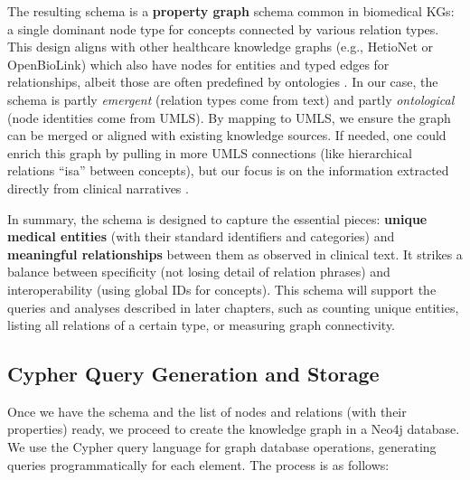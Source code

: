 The resulting schema is a \textbf{property graph} schema common in biomedical KGs: a single dominant node type for concepts connected by various relation types. This design aligns with other healthcare knowledge graphs (e.g., HetioNet or OpenBioLink) which also have nodes for entities and typed edges for relationships, albeit those are often predefined by ontologies \parencite{Himmelstein2017}. In our case, the schema is partly \textit{emergent} (relation types come from text) and partly \textit{ontological} (node identities come from UMLS). By mapping to UMLS, we ensure the graph can be merged or aligned with existing knowledge sources. If needed, one could enrich this graph by pulling in more UMLS connections (like hierarchical relations ``isa'' between concepts), but our focus is on the information extracted directly from clinical narratives \parencite{Cowell2020}.

In summary, the schema is designed to capture the essential pieces: \textbf{unique medical entities} (with their standard identifiers and categories) and \textbf{meaningful relationships} between them as observed in clinical text. It strikes a balance between specificity (not losing detail of relation phrases) and interoperability (using global IDs for concepts). This schema will support the queries and analyses described in later chapters, such as counting unique entities, listing all relations of a certain type, or measuring graph connectivity.

\subsection{Cypher Query Generation and Storage}

Once we have the schema and the list of nodes and relations (with their properties) ready, we proceed to create the knowledge graph in a Neo4j database. We use the Cypher query language for graph database operations, generating queries programmatically for each element. The process is as follows:

